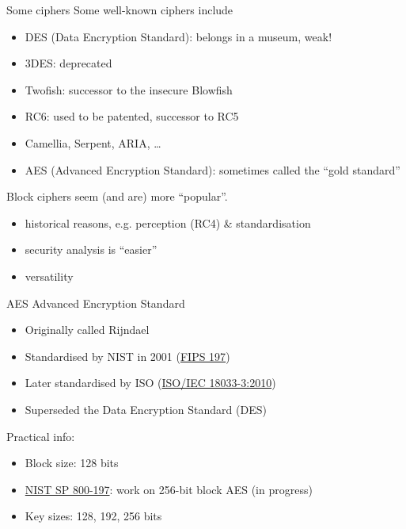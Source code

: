 \begin{frame}{Some ciphers}
  Some well-known ciphers include
  \pause
  \begin{itemize}[<+->]
    \item[\ding{55}] DES (Data Encryption Standard): belongs in a museum, weak!
    \item[\ding{55}] 3DES: deprecated
    \item[\ding{51}] Twofish: successor to the insecure Blowfish
    \item[\ding{51}] RC6: used to be patented, successor to RC5
    \item[\ding{51}] Camellia, Serpent, ARIA, \dots
    \item[\ding{51}]AES (Advanced Encryption Standard): sometimes called the \enquote{gold standard}
  \end{itemize}

  \vspace*{1em}

  \pause
  Block ciphers seem (and are) more \enquote{popular}.
  \begin{itemize}[<+(1)->]
    \item historical reasons, e.g. perception (RC4) \& standardisation
    \item security analysis is \enquote{easier}
    \item versatility
  \end{itemize}
\end{frame}

\begin{frame}{AES}
  Advanced Encryption Standard
  \begin{itemize}[<+(1)->]
    \item Originally called Rijndael
    \item Standardised by NIST in 2001 (\href{https://csrc.nist.gov/pubs/fips/197/final}{FIPS 197})
    \item Later standardised by ISO (\href{https://www.iso.org/standard/54531.html}{ISO/IEC 18033-3:2010})
    \item Superseded the Data Encryption Standard (DES)
  \end{itemize}

  \pause
  Practical info:
  \begin{itemize}[<+->]
    \item Block size: 128 bits
    \item \href{https://csrc.nist.gov/pubs/sp/800/197/iprd}{NIST SP 800-197}: work on 256-bit block AES (in progress)
    \item Key sizes: 128, 192, 256 bits
  \end{itemize}
\end{frame}

